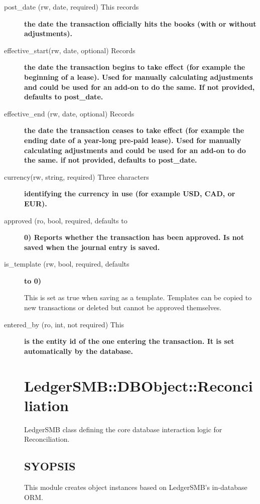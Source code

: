 \begin{description}
\begin{description}
\begin{description}
\begin{description}
\begin{description}
\begin{description}
\begin{description}
\begin{description}
\begin{description}
\item[{post\_date (rw, date, required) This records}] \textbf{the date the transaction officially hits the books (with or without adjustments).}
\item[{effective\_start(rw, date, optional) Records}] \textbf{the date the transaction begins to take effect (for example the beginning of a lease). Used for manually calculating adjustments and could be used for an add-on to do the same. If not provided, defaults to post\_date.}
\item[{effective\_end (rw, date, optional) Records}] \textbf{the date the transaction ceases to take effect (for example the ending date of a year-long pre-paid lease). Used for manually calculating adjustments and could be used for an add-on to do the same. if not provided, defaults to post\_date.}
\item[{currency(rw, string, required) Three characters}] \textbf{identifying the currency in use (for example USD, CAD, or EUR).}
\item[{approved (ro, bool, required, defaults to}] \textbf{0) Reports whether the transaction has been approved. Is not saved when the journal entry is saved.}
\item[{is\_template (rw, bool, required, defaults}] \textbf{to 0)}

This is set as true when saving as a template.  Templates can be copied to new
transactions or deleted but cannot be approved themselves.


\item[{entered\_by (ro, int, not required) This}] \textbf{is the entity id of the one entering the transaction. It is set automatically by the database.}\section{LedgerSMB::DBObject::Reconciliation\label{LedgerSMB::DBObject::Reconciliation}}


LedgerSMB class defining the core 
database interaction logic for Reconciliation.

\subsection*{SYOPSIS\label{LedgerSMB::DBObject::Reconciliation_SYOPSIS}}


This module creates object instances based on LedgerSMB's in-database ORM.


\end{description}
\end{description}
\end{description}
\end{description}
\end{description}
\end{description}
\end{description}
\end{description}
\end{description}
